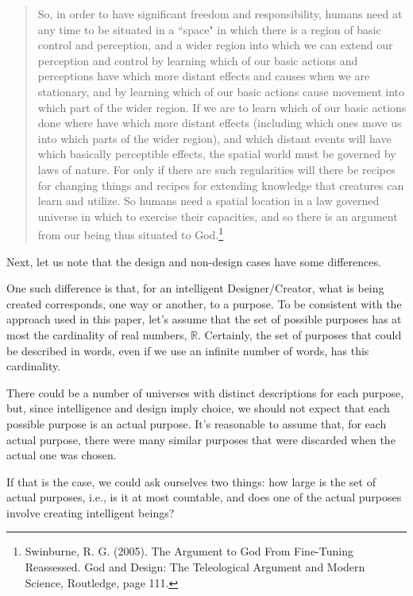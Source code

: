 \documentclass[a4paper
,draft
]{article}
\def\reale{\mathbb{R}}
\newcommand{\paper}[1]{paper}
\newcommand{\ghilimele}[1]{``#1"}
\begin{document}
\begin{quote}
  So, in order to have significant freedom and responsibility, humans need
  at any time to be situated in a \ghilimele{space} in which there is a
  region of basic control and perception, and a wider region into which
  we can extend our perception and control by learning which of our
  basic actions and perceptions have which more distant effects and causes
  when we are stationary, and by learning which of our basic actions cause
  movement into which part of the wider region.
  If we are to learn which of our basic actions done where have which
  more distant effects (including which ones move us into which parts
  of the wider region), and which distant events will have which basically
  perceptible effects, the spatial world must be governed by laws of nature.
  For only if there are such regularities will there be recipes for changing
  things and recipes for extending knowledge that creatures can learn and
  utilize.
  So humans need a spatial location in a law governed universe in which to
  exercise their capacities, and so there is an argument from our being thus
  situated to God.\footnote{
    Swinburne, R. G. (2005). The Argument to God From Fine-Tuning Reassessed.
    God and Design: The Teleological Argument and Modern Science,
    Routledge, page 111.
  }
\end{quote}

Next, let us note that the design and non-design cases
have some differences.

One such difference is that, for an intelligent Designer/Creator, what is being
created corresponds, one way or another, to a purpose.
To be consistent with
the approach used in this \paper{}, let's assume that the set of possible
purposes has at most the cardinality of real numbers, $\reale$. Certainly,
the set of purposes that could be described in words, even if we use an infinite
number of words, has this cardinality.

There could be a number of universes with
distinct descriptions for each purpose, but, since intelligence and design
imply choice, we should not expect that each
possible purpose is an actual purpose.
It's reasonable to assume that, for each actual purpose,
there were many similar purposes that were discarded when the actual one
was chosen.

If that is the case, we could ask ourselves two things:
how large is the set of actual
purposes, i.e., is it at most countable,
and does one of the actual purposes involve creating intelligent beings?
\end{document}
